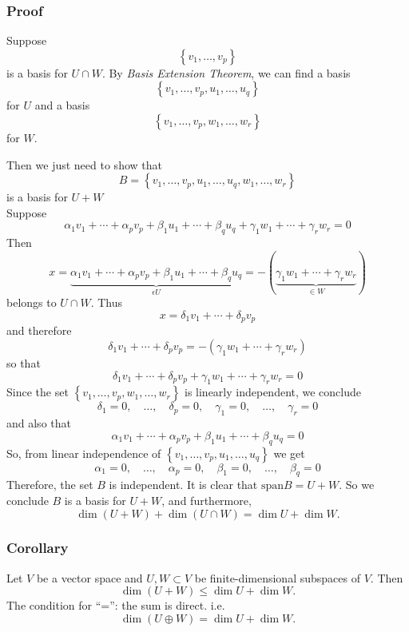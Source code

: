 \documentclass{beamer}
\renewcommand{\emph}[1]{{\color{Turquoise3}\textsl{#1}}}
\begin{document}
\begin{frame}[allowframebreaks]
    \frametitle{Proof}
    Suppose $$\left\{v_{1}, \ldots, v_{p}\right\}$$ is a basis for $U \cap W$. 
    By \emph{Basis Extension Theorem}, we can find a basis
    $$\left\{v_{1}, \ldots, v_{p}, u_{1}, \ldots, u_{q}\right\}$$ for $U$ and a basis
    $$\left\{v_{1}, \ldots, v_{p}, w_{1}, \ldots, w_{r}\right\}$$ for $W$.
    
    Then we just need to show that $$B=\left\{v_{1}, \ldots, v_{p}, u_{1}, \ldots, u_{q}, w_{1}, \ldots, w_{r}\right\}$$ is a basis for $U+W$\\
    \framebreak
    Suppose
    $$
        \alpha_{1} v_{1}+\cdots+\alpha_{p} v_{p}+\beta_{1} u_{1}+\cdots+\beta_{q} u_{q}+\gamma_{1} w_{1}+\cdots+\gamma_{r} w_{r}=0
    $$
    Then
    $$
        x=\underbrace{\alpha_{1} v_{1}+\cdots+\alpha_{p} v_{p}+\beta_{1} u_{1}+\cdots+\beta_{q} u_{q}}_{\epsilon U}=-(\underbrace{\gamma_{1} w_{1}+\cdots+\gamma_{r} w_{r}}_{\in W})
    $$
    belongs to $U \cap W$. Thus
    $$
        x=\delta_{1} v_{1}+\cdots+\delta_{p} v_{p}
    $$
    and therefore
    $$
        \delta_{1} v_{1}+\cdots+\delta_{p} v_{p}=-\left(\gamma_{1} w_{1}+\cdots+\gamma_{r} w_{r}\right)
    $$
    so that
    $$
        \delta_{1} v_{1}+\cdots+\delta_{p} v_{p}+\gamma_{1} w_{1}+\cdots+\gamma_{r} w_{r}=0
    $$
    Since the set $\left\{v_{1}, \ldots, v_{p}, w_{1}, \ldots, w_{r}\right\}$ is linearly independent, we conclude
    $$
        \delta_{1}=0, \quad \ldots, \quad \delta_{p}=0, \quad \gamma_{1}=0, \quad \ldots, \quad \gamma_{r}=0
    $$
    and also that
    $$
        \alpha_{1} v_{1}+\cdots+\alpha_{p} v_{p}+\beta_{1} u_{1}+\cdots+\beta_{q} u_{q}=0
    $$
    So, from linear independence of $\left\{v_{1}, \ldots, v_{p}, u_{1}, \ldots, u_{q}\right\}$ we get
    $$
        \alpha_{1}=0, \quad \ldots, \quad \alpha_{p}=0, \quad \beta_{1}=0, \quad \ldots, \quad \beta_{q}=0
    $$
    Therefore, the set $B$ is independent. It is clear that $\text{span} B=U+W$. So we conclude $B$ is a basis for $U+W$, and furthermore,
    \[\dim(U+W)+\dim(U\cap W)=\dim U+\dim W.\]
\end{frame}

\begin{frame}
    \frametitle{Corollary}
    Let $V$ be a vector space and $U,W\subset V$ be finite-dimensional subspaces of $V$. Then
        \[\dim(U+W)\leq\dim U+\dim W.\]
    The condition for ``='': the sum is direct. i.e.
        \[\dim(U\oplus W)=\dim U+\dim W.\]
    

\end{frame}
\end{document}
